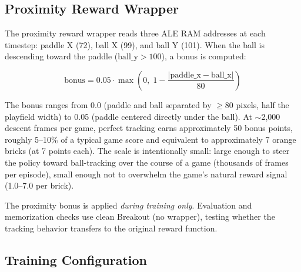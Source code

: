 \documentclass[11pt]{article}
\begin{document}
\subsection{Proximity Reward Wrapper}

The proximity reward wrapper reads three ALE RAM addresses at each timestep:
paddle X (72), ball X (99), and ball Y (101). When the ball is descending
toward the paddle ($\text{ball\_y} > 100$), a bonus is computed:

\begin{equation}
    \text{bonus} = 0.05 \cdot \max\left(0, \; 1 - \frac{|\text{paddle\_x} -
    \text{ball\_x}|}{80}\right)
\end{equation}

The bonus ranges from 0.0 (paddle and ball separated by $\geq$80 pixels, half
the playfield width) to 0.05 (paddle centered directly under the ball). At
$\sim$2,000 descent frames per game, perfect tracking earns approximately 50
bonus points, roughly 5--10\% of a typical game score and equivalent to
approximately 7 orange bricks (at 7 points each). The scale is intentionally
small: large enough to steer the policy toward ball-tracking over the course
of a game (thousands of frames per episode), small enough not to overwhelm the
game's natural reward signal (1.0--7.0 per brick).

The proximity bonus is applied \emph{during training only}.
Evaluation and memorization checks use clean Breakout (no wrapper), testing
whether the tracking behavior transfers to the original reward function.

\subsection{Training Configuration}
\end{document}
